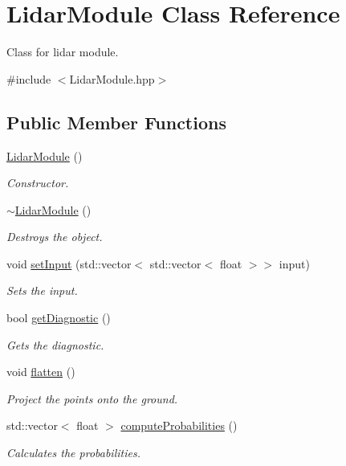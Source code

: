 \hypertarget{class_lidar_module}{}\section{Lidar\+Module Class Reference}
\label{class_lidar_module}


Class for lidar module.  




{\ttfamily \#include $<$Lidar\+Module.\+hpp$>$}

\subsection*{Public Member Functions}
\begin{DoxyCompactItemize}
\item 
\hyperlink{class_lidar_module_aaebef565e883b9254ab61d4ba45a19ec}{Lidar\+Module} ()
\begin{DoxyCompactList}\small\item\em Constructor. \end{DoxyCompactList}\item 
\hyperlink{class_lidar_module_a9f76d762ad58356a109e6ca68e9ab34c}{$\sim$\+Lidar\+Module} ()\hypertarget{class_lidar_module_a9f76d762ad58356a109e6ca68e9ab34c}{}\label{class_lidar_module_a9f76d762ad58356a109e6ca68e9ab34c}

\begin{DoxyCompactList}\small\item\em Destroys the object. \end{DoxyCompactList}\item 
void \hyperlink{class_lidar_module_a05318b0c70f04e9f7e9ec7896c3590cf}{set\+Input} (std\+::vector$<$ std\+::vector$<$ float $>$$>$ input)
\begin{DoxyCompactList}\small\item\em Sets the input. \end{DoxyCompactList}\item 
bool \hyperlink{class_lidar_module_a60f2786b71f6baa0756a2355eb1c908a}{get\+Diagnostic} ()
\begin{DoxyCompactList}\small\item\em Gets the diagnostic. \end{DoxyCompactList}\item 
void \hyperlink{class_lidar_module_a9e968b3f52665b2ec1aaae41122b4d0e}{flatten} ()\hypertarget{class_lidar_module_a9e968b3f52665b2ec1aaae41122b4d0e}{}\label{class_lidar_module_a9e968b3f52665b2ec1aaae41122b4d0e}

\begin{DoxyCompactList}\small\item\em Project the points onto the ground. \end{DoxyCompactList}\item 
std\+::vector$<$ float $>$ \hyperlink{class_lidar_module_aeb655e2c122dc36715f013b92689bda6}{compute\+Probabilities} ()
\begin{DoxyCompactList}\small\item\em Calculates the probabilities. \end{DoxyCompactList}\end{DoxyCompactItemize}


